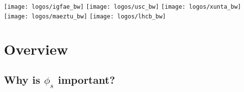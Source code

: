 \documentclass[aspectratio=169,9pt,handout]{beamer}
\begin{document}




\begin{frame}[plain,overlaytitlepage=0.9,backgroundpicture=gpx/aiandes.pdf]
  \begin{minipage}[b][\textheight][b]{5cm}
    \texttt{[image: logos/igfae\_bw]}\hspace{1mm}
    \texttt{[image: logos/usc\_bw]}\hspace{1mm}
    \texttt{[image: logos/xunta\_bw]}\hspace{1mm}\\[2mm]
    \texttt{[image: logos/maeztu\_bw]}\hspace{1mm}
    \texttt{[image: logos/lhcb\_bw]}\\[-1mm]
  \end{minipage}
\end{frame}

\begin{frame}[plain,backgroundpicture=gpx/aiandes.pdf,overlaytoc=0.9]
  \addtocounter{framenumber}{-1}
  \hspace*{8cm}\begin{minipage}{8cm}
    \tableofcontents
  \end{minipage}
\end{frame}




\section{Overview}

\subsection*{Why is \texorpdfstring{$\phi_s$}{phis} important?}
\end{document}
